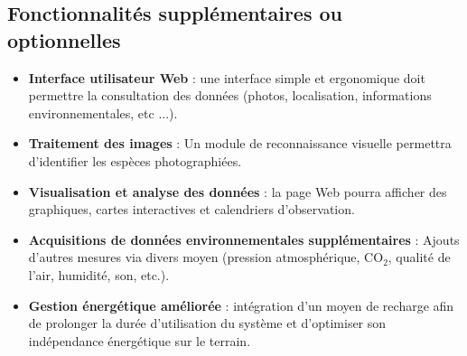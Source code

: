   \subsection{Fonctionnalités supplémentaires ou optionnelles}
  \begin{itemize}
     \item \textbf{Interface utilisateur Web} : une interface simple et ergonomique doit permettre la consultation des données (photos, localisation, informations environnementales, etc ...).
     \item \textbf{Traitement des images} : Un module de reconnaissance visuelle permettra d’identifier les espèces photographiées.
     \item \textbf{Visualisation et analyse des données} : la page Web pourra afficher des graphiques, cartes interactives et calendriers d’observation.
     \item \textbf{Acquisitions de données environnementales supplémentaires} : Ajouts d’autres mesures via divers moyen (pression atmosphérique, CO$_2$, qualité de l’air, humidité, son, etc.).
     \item \textbf{Gestion énergétique améliorée} : intégration d’un moyen de recharge afin de prolonger la durée d’utilisation du système et d’optimiser son indépendance énergétique sur le terrain.
  \end{itemize}
    
